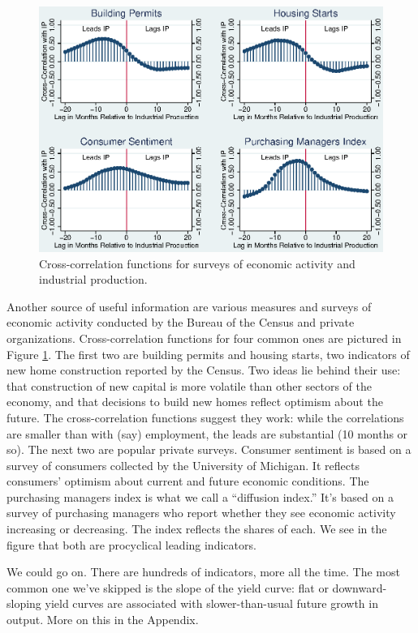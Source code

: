 \documentclass[letterpaper,12pt]{article}
\begin{document}
\begin{figure}
    \centering
    \includegraphics[scale=0.8]{xcsurvey.eps}
    \caption{Cross-correlation functions for 
    surveys of economic activity and industrial production.} 
    \label{fig:ccf-survey}%
\end{figure}

Another source of useful information are various measures and surveys 
of economic activity conducted by 
the Bureau of the Census and private organizations.
Cross-correlation functions for four common ones are pictured in 
Figure \ref{fig:ccf-survey}.
The first two are building permits and housing starts, 
two indicators of new home construction reported by the Census.
Two ideas lie behind their use:  that 
construction of new capital is more volatile than 
other sectors of the economy, 
and that decisions to build new homes reflect optimism 
about the future.  
The cross-correlation functions suggest they work:  
while the correlations are 
smaller than with (say) employment, the leads are substantial 
(10 months or so).  
The next two are popular private surveys.
Consumer sentiment is based on a survey of consumers 
collected by the University of Michigan.
It reflects consumers' optimism about current and future economic conditions.
The purchasing managers index is what we call a ``diffusion index.'' 
It's based on a survey of purchasing managers who report whether 
they see economic activity increasing or decreasing.  
The index reflects the shares of each.  
We see in the figure that both are procyclical leading indicators.


We could go on.  There are hundreds of indicators, more all the time.
The most common one we've skipped is the slope of the yield curve:
flat or downward-sloping yield curves are associated with slower-than-usual 
future growth in output.  
More on this in the Appendix. 
\end{document}
